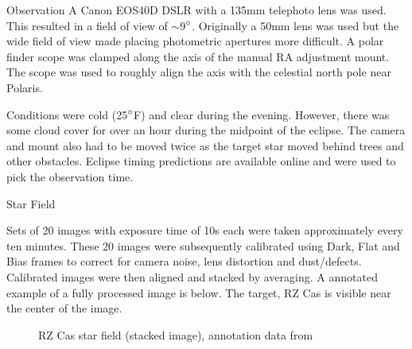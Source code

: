 \documentclass[final]{beamer}
\newlength{\colwidth}
\begin{document}
\begin{frame}[t]
\begin{columns}[t]
\begin{column}{\colwidth}
\begin{block}{Observation}
    A Canon EOS40D DSLR with a 135mm telephoto lens was used. This resulted
    in a field of view of $\sim$9$\degree$. Originally a 50mm lens was used but the wide
    field of view made placing photometric apertures more difficult.  A polar finder scope was clamped along the axis of the manual RA adjustment mount. The scope was used to roughly align the axis with the celestial north pole near Polaris. 

    Conditions were cold (25$\degree$F) and clear during the evening. However, there was some 
    cloud cover for over an hour during the midpoint of the eclipse. The camera and mount 
    also had to be moved twice as the target star moved behind trees and other obstacles.  
    Eclipse timing predictions are available online and were used to pick the observation 
    time.

  \end{block}

  \begin{block}{Star Field}

    Sets of 20 images with exposure time of 10s each were taken approximately every ten
    minutes. These 20 images were subsequently calibrated using Dark, Flat and Bias frames
    to correct for camera noise, lens distortion and dust/defects. Calibrated images were
    then aligned and stacked by averaging. A annotated example of a fully processed image
    is below. The target, RZ Cas is visible near the center of the image.

    \begin{figure}
      \centering
        \caption{RZ Cas star field (stacked image), annotation data from \cite{2000A&AS..143....9W}}
    \end{figure}

  \end{block}


\end{column}
\end{columns}
\end{frame}
\end{document}
